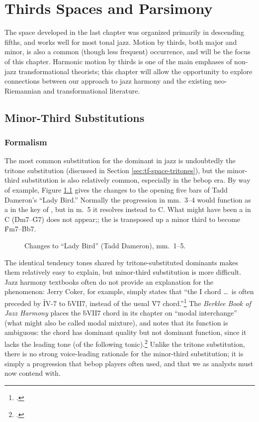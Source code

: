 
\chapter{Thirds Spaces and Parsimony}

The space developed in the last chapter was organized primarily in descending
fifths, and works well for most tonal jazz. Motion by thirds, both major and
minor, is also a common (though less frequent) occurrence, and will be the
focus of this chapter. Harmonic motion by thirds is one of the main
emphases of non-jazz transformational theorists; this chapter will allow the
opportunity to explore connections between our approach to jazz harmony and
the existing neo-Riemannian and transformational literature.

\section{Minor-Third Substitutions}
\label{sec:minor-third-subst}

\subsection{Formalism}
\label{sec:m3-formalism}

The most common substitution for the dominant in jazz is undoubtedly the
tritone substitution (discussed in Section \ref{sec:tf-space-tritones}), but
the minor-third substitution is also relatively common, especially in the
bebop era. By way of example, Figure \ref{mts:ladybird-changes} gives the
changes to the opening five bars of Tadd Dameron's ``Lady Bird.'' Normally the
progression in mm.~3--4 would function as a \tf in the key of \Eflat, but in
m.~5 it resolves instead to C. What might have been a \tfo in C
(\h{Dm7}--\h{G7}) does not appear;; the \tf is transposed up a minor third to
become \h{Fm7}--\h{Bb7}.

\begin{figure}[tbp]
  \caption{Changes to ``Lady Bird'' (Tadd Dameron), mm.~1--5.}
  \label{mts:ladybird-changes}
\end{figure}

The identical tendency tones shared by tritone-substituted dominants makes
them relatively easy to explain, but minor-third substitution is more
difficult. Jazz harmony textbooks often do not provide an explanation for the
phenomenon: Jerry Coker, for example, simply states that ``the I chord \ldots\ is often
preceded by \h{IV-7} to \h{bVII7}, instead of the usual \h{V7}
chord.''\footcite[82]{coker:elements} The \emph{Berklee Book of Jazz Harmony}
places the \h{bVII7} chord in its chapter on ``modal interchange'' (what might
also be called modal mixture), and notes that its function is ambiguous:
the chord has dominant quality but not dominant function, since it lacks the
leading tone (of the following tonic).\footcite[123--24]{berklee:harmony} Unlike the tritone
substitution, there is no strong voice-leading rationale for the minor-third
substitution; it is simply a progression that bebop players often used, and
that we as analysts must now contend with.

